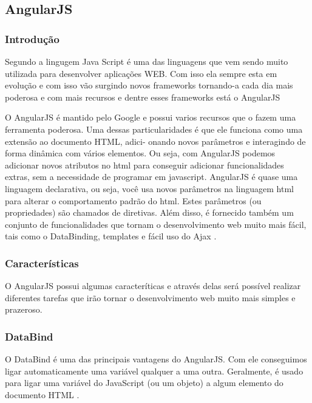 \subsection{AngularJS}

\subsubsection{Introdução}

\par Segundo  a lingugem Java Script
é uma das linguagens que vem sendo muito utilizada para desenvolver aplicações WEB. Com isso ela sempre esta em evolução e com isso
vão surgindo novos frameworks tornando-a cada dia mais poderosa e com mais
recursos e dentre esses frameworks está o AngularJS

\par O AngularJS é mantido pelo Google e possui varios recursos que o fazem uma
ferramenta poderosa.
Uma dessas particularidades é que ele funciona como uma extensão ao documento HTML, adici-
onando novos parâmetros e interagindo de forma dinâmica com vários elementos. Ou seja, com
AngularJS podemos adicionar novos atributos no html para conseguir adicionar funcionalidades
extras, sem a necessidade de programar em javascript.
AngularJS é quase uma linguagem declarativa, ou seja, você usa novos parâmetros na linguagem
html para alterar o comportamento padrão do html. Estes parâmetros (ou propriedades) são
chamados de diretivas.
Além disso, é fornecido também um conjunto de funcionalidades que tornam o desenvolvimento
web muito mais fácil, tais como o DataBinding, templates e fácil uso do Ajax
\cite{livro_java_Guia_do_Programador}.

\subsubsection{Características}

\par O AngularJS possui algumas caracteríticas e através delas será possível
realizar diferentes tarefas que irão tornar o desenvolvimento web muito mais simples e prazeroso.

\subsubsection{DataBind}

\par O DataBind é uma das principais vantagens do AngularJS.
Com ele conseguimos ligar automaticamente uma variável qualquer a uma outra.
Geralmente, é usado para ligar uma variável do JavaScript (ou um objeto) a algum
elemento do documento HTML \cite{livro_java_Guia_do_Programador}.

